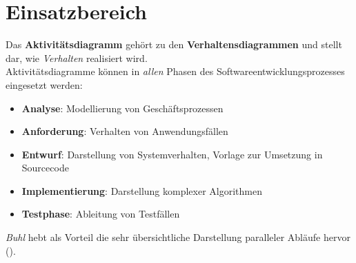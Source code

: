\section{Einsatzbereich}

Das \textbf{Aktivitätsdiagramm} gehört zu den \textbf{Verhaltensdiagrammen} und stellt dar, wie \textit{Verhalten} realisiert wird.\\

\noindent
Aktivitätsdiagramme können in \textit{allen} Phasen des Softwareentwicklungsprozesses eingesetzt werden:

\begin{itemize}
    \item \textbf{Analyse}: Modellierung von Geschäftsprozessen
    \item \textbf{Anforderung}: Verhalten von Anwendungsfällen
    \item \textbf{Entwurf}: Darstellung von Systemverhalten, Vorlage zur Umsetzung in Sourcecode
    \item \textbf{Implementierung}: Darstellung komplexer Algorithmen
    \item \textbf{Testphase}: Ableitung von Testfällen
\end{itemize}

\noindent
\textit{Buhl} hebt als Vorteil die sehr übersichtliche Darstellung paralleler Abläufe hervor (\cite[57]{Buh09}).